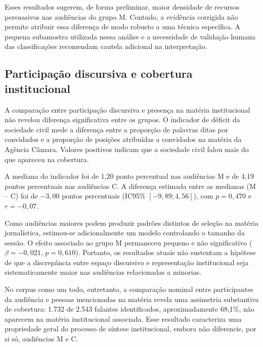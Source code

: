 Esses resultados sugerem, de forma preliminar, maior densidade de recursos
persuasivos nas audiências do grupo M. Contudo, a evidência corrigida não
permite atribuir essa diferença de modo robusto a uma técnica específica. A
pequena subamostra utilizada nessa análise e a necessidade de validação humana
das classificações recomendam cautela adicional na interpretação.

\subsection{Participação discursiva e cobertura institucional}

A comparação entre participação discursiva e presença na matéria institucional
não revelou diferença significativa entre os grupos. O indicador de déficit da
sociedade civil mede a diferença entre a proporção de palavras ditas por
convidados e a proporção de posições atribuídas a convidados na matéria da
Agência Câmara. Valores positivos indicam que a sociedade civil falou mais do
que apareceu na cobertura.

A mediana do indicador foi de 1,20 ponto percentual nas audiências M e de 4,19
pontos percentuais nas audiências C. A diferença estimada entre as medianas
(M -- C) foi de $-3{,}00$ pontos percentuais (IC95\% $[-9{,}89;4{,}56]$), com
$p=0{,}470$ e $r=-0{,}07$.

Como audiências maiores podem produzir padrões distintos de seleção na matéria
jornalística, estimou-se adicionalmente um modelo controlando o tamanho da
sessão. O efeito associado ao grupo M permaneceu pequeno e não significativo
($\beta=-0{,}021$, $p=0{,}610$). Portanto, os resultados atuais não sustentam a
hipótese de que a discrepância entre espaço discursivo e representação
institucional seja sistematicamente maior nas audiências relacionadas a
minorias.

No corpus como um todo, entretanto, a comparação nominal entre participantes
da audiência e pessoas mencionadas na matéria revela uma assimetria substantiva
de cobertura: 1.732 de 2.543 falantes identificados, aproximadamente 68,1\%,
não aparecem na matéria institucional associada. Esse resultado caracteriza uma
propriedade geral do processo de síntese institucional, embora não diferencie,
por si só, audiências M e C.
